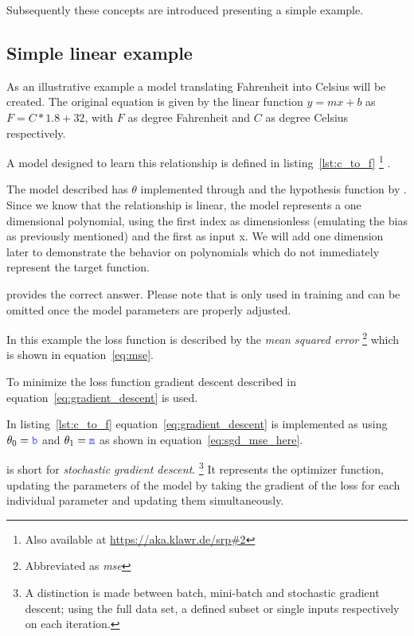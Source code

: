 Subsequently these concepts are introduced presenting a simple example.

\subsection{Simple linear example} \label{ch:simple_linear_example}

As an illustrative example a model translating Fahrenheit into Celsius will be created.
The original equation is given by the linear function $y = mx + b$ as $F = C * 1.8 + 32$, with $F$ as degree Fahrenheit and $C$ as degree Celsius respectively.

A model designed to learn this relationship is defined in listing~\ref{lst:c_to_f} \footnote{Also available at \url{https://aka.klawr.de/srp\#2}} .



The model described has $\theta$ implemented through  and the hypothesis function by .
Since we know that the relationship is linear, the model represents a one dimensional polynomial, using the first index as dimensionless (emulating the bias as previously mentioned) and the first as input x.
We will add one dimension later to demonstrate the behavior on polynomials which do not immediately represent the target function.

 provides the correct answer.
Please note that  is only used in training and can be omitted once the model parameters are properly adjusted.

In this example the loss function is described by the \textit{mean squared error } \footnote{ Abbreviated as \textit{mse} } which is shown in equation~\eqref{eq:mse}.

To minimize the loss function gradient descent described in equation~\eqref{eq:gradient_descent} is used.

In listing~\ref{lst:c_to_f} equation~\eqref{eq:gradient_descent} is implemented as  using $\theta_0 = \code{b}$ and $\theta_1= \code{m}$ as shown in equation~\eqref{eq:sgd_mse_here}.

 is short for \textit{stochastic gradient descent}.
\footnote{A distinction is made between batch, mini-batch and stochastic
    gradient descent;
    using the full data set, a defined subset or single inputs respectively on
    each iteration.}
It represents the optimizer function, updating the parameters of the model by taking the gradient of the loss for each individual parameter and updating them simultaneously.

